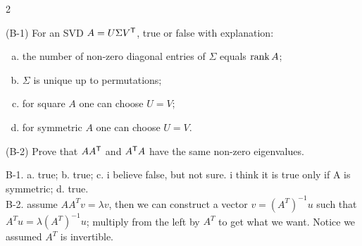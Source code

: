 \begin{paracol}{2}
\begin{exercise}[PS1 (2013), B-1 and B-2]
(B-1) For an SVD $A=U\Sigma V^{\mathsf T}$, true or false with explanation:
\begin{enumerate}[(a)]
  \item the number of non-zero diagonal entries of
      $\Sigma$ equals $\operatorname{rank} A$;
  \item $\Sigma$ is unique up to permutations;
  \item for square $A$ one can choose $U=V$;
  \item for symmetric $A$ one can choose $U=V$.
\end{enumerate}
(B-2) Prove that $AA^{\mathsf T}$ and $A^{\mathsf T} A$ have the same non-zero eigenvalues.
\end{exercise}
\begin{mysolution}
  B-1. a. true; b. true; c. i believe false, but not sure. i think it is true only if A is symmetric; d. true. \\
  B-2. assume $AA^T v = \lambda v$, then we can construct a vector $v = (A^T)^{-1} u$ such that $A^T u = \lambda (A^T)^{-1} u$; multiply from the left by $A^T$ to get what we want. Notice we assumed $A^T$ is invertible.
\end{mysolution}


\end{paracol}
